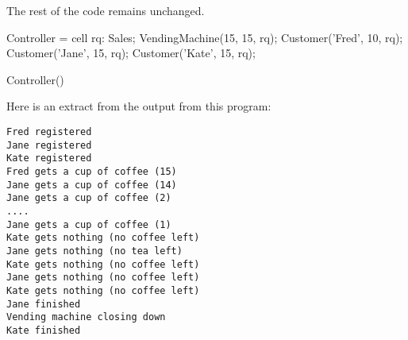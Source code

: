 The rest of the code remains unchanged.
\begin{code}
Controller = cell
{
    rq: Sales;
    VendingMachine(15, 15, rq);
    Customer('Fred', 10, rq);
    Customer('Jane', 15, rq);
    Customer('Kate', 15, rq);
}
\end{code}

\begin{code}
Controller()
\end{code}

Here is an extract from the output from this program:
\begin{verbatim}
Fred registered
Jane registered
Kate registered
Fred gets a cup of coffee (15)
Jane gets a cup of coffee (14)
Jane gets a cup of coffee (2)
....
Jane gets a cup of coffee (1)
Kate gets nothing (no coffee left)
Jane gets nothing (no tea left)
Kate gets nothing (no coffee left)
Jane gets nothing (no coffee left)
Kate gets nothing (no coffee left)
Jane finished
Vending machine closing down
Kate finished
\end{verbatim}

